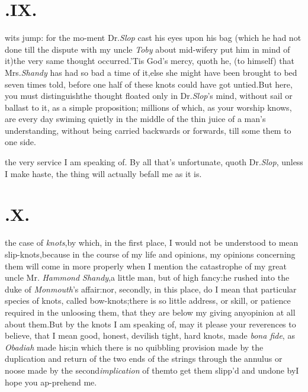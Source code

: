 \documentclass{article}
\begin{document}
\section{.\quad  IX.}

 wits jump: for the mo-\break ment Dr.\@ \textit{Slop} cast his eyes upon\break
his bag (which he
had not done till the dispute with my uncle \textit{Toby} about mid-wifery put him
in mind of it)\tsk the very same thought occurred.\tsh ’Tis God’s mercy, quoth he, (to
himself) that Mrs.\@ \textit{Shandy} has had so bad a time of it,\tsh else she might
have been brought to bed seven times told, before one half of these knots could have
got untied.\tsh But here, you must distinguish\tsh the\break
thought floated only in Dr.\@ \textit{Slop}’s mind,\break
without sail or ballast to it, as a simple proposition;
millions of which, as your worship knows, are every day swiming quietly in the
middle of the thin juice of a man’s understanding, without being carried backwards
or forwards, till some\break
{} them to one side.

  the very service I am speaking of. By
all that’s unfortunate, quoth Dr.\@ \textit{Slop}, unless I make
haste, the thing will actually befall me as it is.

\vfill{}\eject

\section{.\quad  X.}

 the case of \textit{knots},\tsh by which, in\break
the first place, I would not be under\-stood to mean slip-knots,\tsk because in the course of my life and
opinions,\tsh\break
my opinions concerning them will come in more properly when I mention the
catastrophe of my great uncle Mr.  \textit{Hammond Shandy},\tsk a little man,\tsk
but of\break
high fancy:\tsk he rushed into the duke of \textit{Monmouth}’s affair:\tsh nor,
secondly, in this place, do I mean that particular species of knots, called
bow-knots;\tsk there is so little address, or skill, or patience required in the
unloosing them, that they are below my giving any\break opinion at all about them.\tsk But
by the knots I am speaking of, may it please your reverences to believe, that I
mean
good, honest, devilish tight, hard knots, made \textit{bona fide}, as
\textit{Obadiah} made his;\tsh in which there is no quibbling provision made by the
duplication and return of the two ends of the strings through the annulus or noose
made by the second\break\textit{implication} of them\tsk to get them slipp’d and
undone by\tsh\tsh I hope you ap-\break prehend me.
\end{document}

